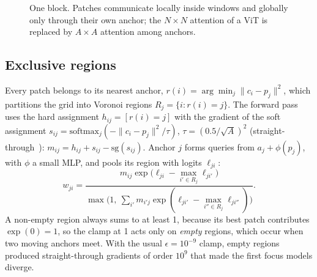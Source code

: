 \documentclass[runningheads]{llncs}
\begin{document}
\begin{figure}[t]
\centering
{}
\caption{One block. Patches communicate locally inside windows and globally only through their
own anchor; the $N\times N$ attention of a ViT is replaced by $A\times A$ attention among anchors.}
\label{fig:block}
\end{figure}

\subsection{Exclusive regions}

Every patch belongs to its nearest anchor, $r(i)=\arg\min_j\|c_i-p_j\|^2$, which partitions the
grid into Voronoi regions $R_j=\{i: r(i)=j\}$. The forward pass uses the hard assignment
$h_{ij}=[r(i)=j]$ with the gradient of the soft assignment
$s_{ij}=\mathrm{softmax}_j(-\|c_i-p_j\|^2/\tau)$, $\tau=(0.5/\sqrt{A})^2$
(straight-through~\cite{bengio2013straight}): $m_{ij}=h_{ij}+s_{ij}-\mathrm{sg}(s_{ij})$.
Anchor $j$ forms queries from $a_j+\phi(p_j)$, with $\phi$ a small MLP, and pools its region with
logits $\ell_{ji}$:
\begin{equation}
w_{ji}=\frac{m_{ij}\exp\!\big(\ell_{ji}-\max_{i'\in R_j}\ell_{ji'}\big)}
{\max\!\big(1,\ \sum_{i'} m_{i'j}\exp(\ell_{ji'}-\max_{i''\in R_j}\ell_{ji''})\big)} .
\label{eq:pool}
\end{equation}
A non-empty region always sums to at least 1, because its best patch contributes $\exp(0)=1$, so
the clamp at 1 acts only on \emph{empty} regions, which occur when two moving anchors meet. With
the usual $\epsilon=10^{-9}$ clamp, empty regions produced straight-through gradients of order
$10^{9}$ that made the first focus models diverge.
\end{document}
